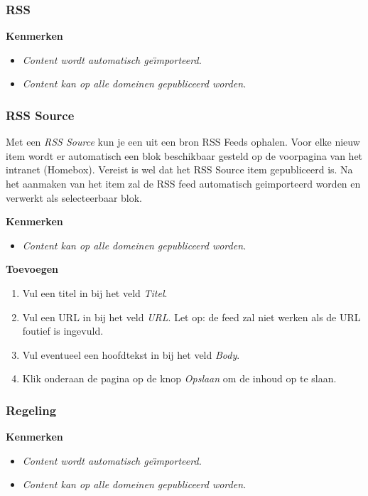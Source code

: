 \subsubsection{RSS}\label{rss}

\textbf{Kenmerken}

\begin{itemize}
\item \emph{Content wordt automatisch ge{\"\i}mporteerd.}
\item \emph{Content kan op alle domeinen gepubliceerd worden.}
\end{itemize}

\subsubsection{RSS Source}\label{rsssource}
Met een \emph{RSS Source} kun je een uit een bron RSS Feeds ophalen. Voor elke nieuw item wordt er automatisch een blok beschikbaar gesteld op de voorpagina van het intranet (Homebox). Vereist is wel dat het RSS Source item gepubliceerd is. Na het aanmaken van het item zal de RSS feed automatisch geimporteerd worden en verwerkt als selecteerbaar blok.

\textbf{Kenmerken}

\begin{itemize}
\item \emph{Content kan op alle domeinen gepubliceerd worden.}
\end{itemize}

\textbf{Toevoegen}

\begin{enumerate}
\item Vul een titel in bij het veld \emph{Titel}.
\item Vul een URL in bij het veld \emph{URL}. Let op: de feed zal niet werken als de URL foutief is ingevuld.
\item Vul eventueel een hoofdtekst in bij het veld \emph{Body}.
\item Klik onderaan de pagina op de knop \emph{Opslaan} om de inhoud op te slaan.
\end{enumerate}

\subsubsection{Regeling}\label{regeling}

\textbf{Kenmerken}

\begin{itemize}
\item \emph{Content wordt automatisch ge{\"\i}mporteerd.}
\item \emph{Content kan op alle domeinen gepubliceerd worden.}
\end{itemize}

